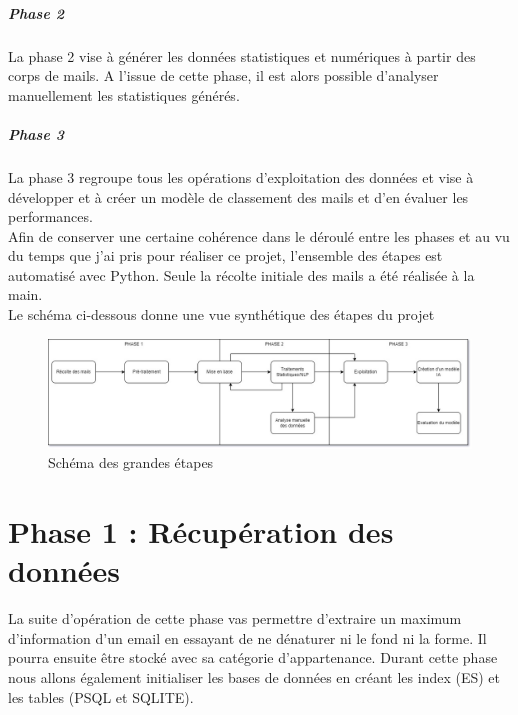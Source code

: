 \documentclass[a4paper,12pt]{article}
\begin{document}
	\subparagraph{Phase 2} La phase 2 vise à générer les données statistiques et numériques à partir des corps de mails. A l'issue de cette phase, il est alors possible d'analyser manuellement les statistiques générés.
	
	\subparagraph{Phase 3} La phase 3 regroupe tous les opérations d'exploitation des données et vise à développer et à créer un modèle de classement des mails et d'en évaluer les performances.\\
	
	Afin de conserver une certaine cohérence dans le déroulé entre les phases et au vu du temps que j'ai pris pour réaliser ce projet, l'ensemble des étapes est automatisé avec Python. Seule la récolte initiale des mails a été réalisée à la main.\\
	
	Le schéma ci-dessous donne une vue synthétique des étapes du projet
	\begin{figure}[H]
		\includegraphics[width=\linewidth]{img/SchemaGeneral.jpg}
		\caption{Schéma des grandes étapes}
	\end{figure}
		 
\newpage

\section{Phase 1 : Récupération des données}
	La suite d'opération de cette phase vas permettre d'extraire un maximum d'information d'un email en essayant de ne dénaturer ni le fond ni la forme. Il pourra ensuite être stocké avec sa catégorie d'appartenance. Durant cette phase nous allons également initialiser les bases de données en créant les index (ES) et les tables (PSQL et SQLITE). 
	
\end{document}

